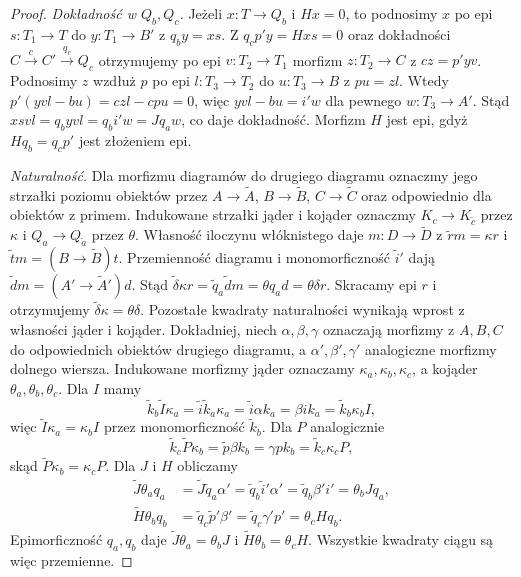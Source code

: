 \begin{proof}
\emph{Dokładność w $Q_b,Q_c$.}
Jeżeli $x:T\to Q_b$ i $Hx=0$, to podnosimy $x$ po epi $s:T_1\to T$ do $y:T_1\to B'$ z $q_by=xs$. Z $q_c p'y=Hxs=0$ oraz dokładności $C\xrightarrow c C'\xrightarrow{q_c}Q_c$ otrzymujemy po epi $v:T_2\to T_1$ morfizm $z:T_2\to C$ z $cz=p'yv$. Podnosimy $z$ wzdłuż $p$ po epi $l:T_3\to T_2$ do $u:T_3\to B$ z $pu=zl$. Wtedy $p'(yvl-bu)=czl-cpu=0$, więc $yvl-bu=i'w$ dla pewnego $w:T_3\to A'$. Stąd $xsvl=q_b yvl=q_b i'w=Jq_aw$, co daje dokładność. Morfizm $H$ jest epi, gdyż $Hq_b=q_cp'$ jest złożeniem epi.

\emph{Naturalność.}
Dla morfizmu diagramów do drugiego diagramu oznaczmy jego strzałki poziomu obiektów przez $A\to\widetilde A$, $B\to\widetilde B$, $C\to\widetilde C$ oraz odpowiednio dla obiektów z primem. Indukowane strzałki jąder i kojąder oznaczmy $K_c\to K_{\tilde c}$ przez $\kappa$ i $Q_a\to Q_{\tilde a}$ przez $\theta$. Własność iloczynu włóknistego daje $m:D\to\widetilde D$ z $\tilde r m=\kappa r$ i $\tilde t m=(B\to\widetilde B)t$. Przemienność diagramu i monomorficzność $\tilde i'$ dają $\tilde d m=(A'\to\widetilde A')d$. Stąd
$\tilde\delta\kappa r=\tilde q_a\tilde d m=\theta q_a d=\theta\delta r$.
Skracamy epi $r$ i otrzymujemy $\tilde\delta\kappa=\theta\delta$.
Pozostałe kwadraty naturalności wynikają wprost z własności jąder i kojąder. Dokładniej, niech $\alpha,\beta,\gamma$ oznaczają morfizmy z $A,B,C$ do odpowiednich obiektów drugiego diagramu, a $\alpha',\beta',\gamma'$ analogiczne morfizmy dolnego wiersza. Indukowane morfizmy jąder oznaczamy $\kappa_a,\kappa_b,\kappa_c$, a kojąder $\theta_a,\theta_b,\theta_c$. Dla $I$ mamy
\[
\tilde k_b\tilde I\kappa_a
=\tilde i\tilde k_a\kappa_a
=\tilde i\alpha k_a=\beta i k_a
=\tilde k_b\kappa_b I,
\]
więc $\tilde I\kappa_a=\kappa_b I$ przez monomorficzność $\tilde k_b$. Dla $P$ analogicznie
\[
\tilde k_c\tilde P\kappa_b=\tilde p\beta k_b
=\gamma p k_b=\tilde k_c\kappa_c P,
\]
skąd $\tilde P\kappa_b=\kappa_c P$. Dla $J$ i $H$ obliczamy
\[
\begin{aligned}
\tilde J\theta_a q_a&=\tilde J\tilde q_a\alpha'
=\tilde q_b\tilde i'\alpha'=\tilde q_b\beta'i'=\theta_b Jq_a,\\
\tilde H\theta_b q_b&=\tilde q_c\tilde p'\beta'
=\tilde q_c\gamma'p'=\theta_c Hq_b.
\end{aligned}
\]
Epimorficzność $q_a,q_b$ daje $\tilde J\theta_a=\theta_b J$ i $\tilde H\theta_b=\theta_c H$. Wszystkie kwadraty ciągu są więc przemienne.
\end{proof}
